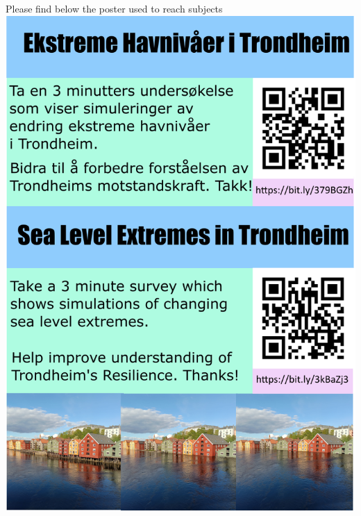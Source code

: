 Please find below the poster used to reach subjects
\newpage
\includegraphics[width=1\textwidth]{fig_appendix/poster 4.0.png}